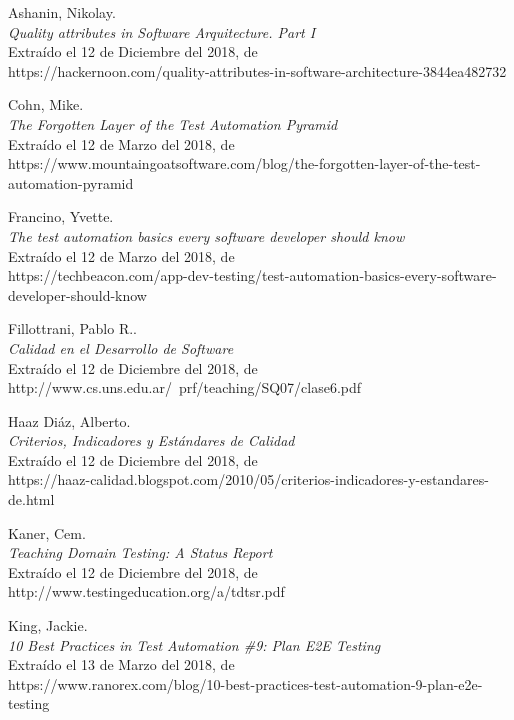 
\begin{thebibliography}{99}

 Ashanin, Nikolay.\\ %
\emph{Quality attributes in Software Arquitecture. Part I}\\
Extraído el 12 de Diciembre del 2018, de\\
https://hackernoon.com/quality-attributes-in-software-architecture-3844ea482732

 Cohn, Mike.\\
\emph{The Forgotten Layer of the Test Automation Pyramid}\\
Extraído el 12 de Marzo del 2018, de\\
https://www.mountaingoatsoftware.com/blog/the-forgotten-layer-of-the-test-automation-pyramid

 Francino, Yvette.\\
\emph{The test automation basics every software developer should know}\\
Extraído el 12 de Marzo del 2018, de\\
https://techbeacon.com/app-dev-testing/test-automation-basics-every-software-developer-should-know

 Fillottrani, Pablo R..\\ %
\emph{Calidad en el Desarrollo de Software}\\
Extraído el 12 de Diciembre del 2018, de\\
http://www.cs.uns.edu.ar/~prf/teaching/SQ07/clase6.pdf

 Haaz Diáz, Alberto.\\ %
\emph{Criterios, Indicadores y Estándares de Calidad}\\
Extraído el 12 de Diciembre del 2018, de\\
https://haaz-calidad.blogspot.com/2010/05/criterios-indicadores-y-estandares-de.html

 Kaner, Cem.\\ %
\emph{Teaching Domain Testing: A Status Report}\\
Extraído el 12 de Diciembre del 2018, de\\
http://www.testingeducation.org/a/tdtsr.pdf

 King, Jackie.\\
\emph{10 Best Practices in Test Automation \#9: Plan E2E Testing}\\
Extraído el 13 de Marzo del 2018, de\\
https://www.ranorex.com/blog/10-best-practices-test-automation-9-plan-e2e-testing


\end{thebibliography}
